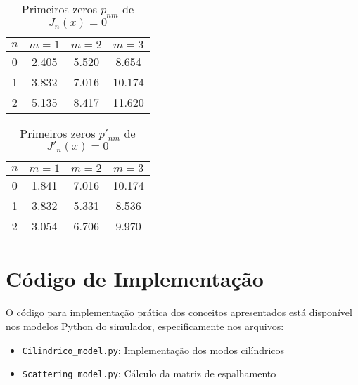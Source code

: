 \documentclass[a4paper,12pt]{article}
\begin{document}
\begin{table}[H]
\centering
\caption{Primeiros zeros $p_{nm}$ de $J_n(x) = 0$}
\begin{tabular}{cccc}
\toprule
$n$ & $m=1$ & $m=2$ & $m=3$ \\
\midrule
0 & 2.405 & 5.520 & 8.654 \\
1 & 3.832 & 7.016 & 10.174 \\
2 & 5.135 & 8.417 & 11.620 \\
\bottomrule
\end{tabular}
\end{table}

\begin{table}[H]
\centering
\caption{Primeiros zeros $p'_{nm}$ de $J'_n(x) = 0$}
\begin{tabular}{cccc}
\toprule
$n$ & $m=1$ & $m=2$ & $m=3$ \\
\midrule
0 & 1.841 & 7.016 & 10.174 \\
1 & 3.832 & 5.331 & 8.536 \\
2 & 3.054 & 6.706 & 9.970 \\
\bottomrule
\end{tabular}
\end{table}

\section{Código de Implementação}

O código para implementação prática dos conceitos apresentados está disponível nos modelos Python do simulador, especificamente nos arquivos:
\begin{itemize}
    \item \texttt{Cilindrico\_model.py}: Implementação dos modos cilíndricos
    \item \texttt{Scattering\_model.py}: Cálculo da matriz de espalhamento
\end{itemize}
\end{document}
